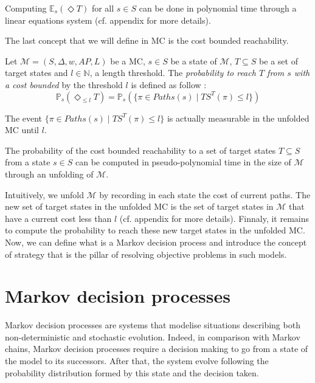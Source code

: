 \begin{theorem}
  Computing $\mathbb{E}_s(\Diamond T)$ for all $s \in S$ can be done in polynomial time through a linear equations system (cf. appendix for more details).
\end{theorem}

The last concept that we will define in MC is the cost bounded reachability.

\begin{definition}
	Let $\mathcal{M} = (S, \Delta, w, AP, L)$ be a MC, $s \in S$ be a state of $\mathcal{M}$, $T \subseteq S$ be a set of target states and $l \in \mathbb{N}$, a length threshold.
  The \textit{probability to reach $T$ from $s$ with a cost bounded} by the threshold $l$ is defined as follow :
	\[
    \mathbb{P}_s(\Diamond_{\leq l} T) = \mathbb{P}_s(\{\pi \in Paths(s) \; | \; TS^T(\pi) \leq l \})
  \]
\end{definition}
The event $\{\pi \in Paths(s) \; | \; TS^T(\pi) \leq l \}$ is actually measurable
in the unfolded MC until $l$.
\begin{theorem}
  The probability of the cost bounded reachability to a set of target states $T \subseteq S$ from a state $s \in S$ can be computed in pseudo-polynomial time in the size of $\mathcal{M}$ through an unfolding of $\mathcal{M}$.
\end{theorem}

Intuitively, we unfold $\mathcal{M}$ by recording in each state the cost of
current paths. The new set of target states in the unfolded MC is the set of
target states in $\mathcal{M}$ that have a current cost less than $l$ (cf.
appendix for more details). Finnaly, it remains to compute the probability to
reach these new target states in the unfolded MC. \\

Now, we can define what is a Markov decision process and introduce the concept of strategy that is the pillar of resolving objective problems in such models.

\section{Markov decision processes}
Markov decision processes are systems that modelise situations describing both non-deterministic and stochastic evolution. Indeed, in comparison with Markov chains, Markov decision processes require a decision making to go from a state of the model to its successors. After that, the system evolve following the probability distribution formed by this state and the decision taken.

